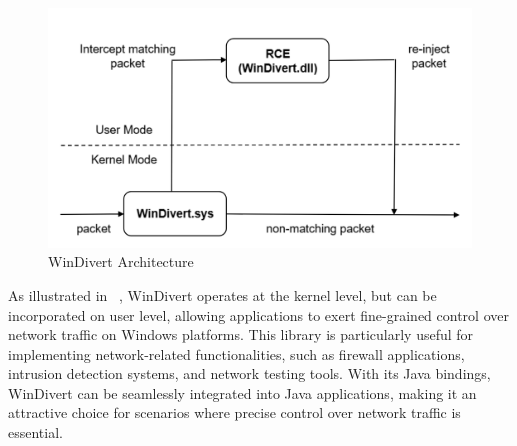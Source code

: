 \begin{figure}
    \centering
    \includegraphics[width=\linewidth]{files/figures/WinDivert.png}
    \caption{WinDivert Architecture}
    \label{fig:WinDivert}
\end{figure}

As illustrated in ~, WinDivert operates at the kernel level, but can be incorporated on user level, allowing applications to exert fine-grained control over network traffic on Windows platforms. This library is particularly useful for implementing network-related functionalities, such as firewall applications, intrusion detection systems, and network testing tools. With its Java bindings, WinDivert can be seamlessly integrated into Java applications, making it an attractive choice for scenarios where precise control over network traffic is essential.~\cite{noauthor_windivert:_nodate}